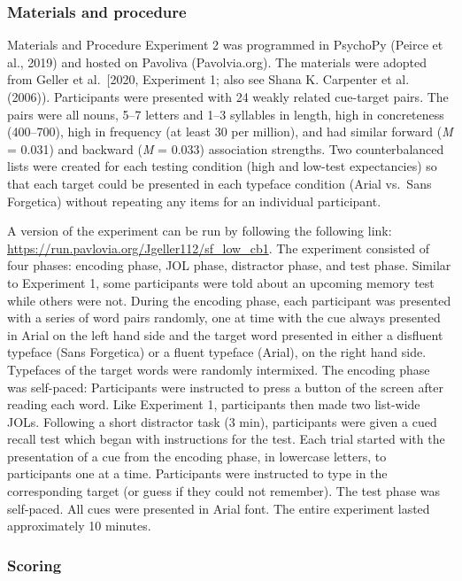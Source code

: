 \documentclass[
  english,
  jou]{apa7}
\begin{document}
\hypertarget{materials-and-procedure}{%
\subsubsection{Materials and procedure}\label{materials-and-procedure}}

Materials and Procedure
Experiment 2 was programmed in PsychoPy (Peirce et al., 2019) and hosted on Pavoliva (Pavolvia.org). The materials were adopted from Geller et al.~{[}2020, Experiment 1; also see Shana K. Carpenter et al. (2006)). Participants were presented with 24 weakly related cue-target pairs. The pairs were all nouns, 5--7 letters and 1--3 syllables in length, high in concreteness (400--700), high in frequency (at least 30 per million), and had similar forward (\emph{M} = 0.031) and backward (\emph{M} = 0.033) association strengths. Two counterbalanced lists were created for each testing condition (high and low-test expectancies) so that each target could be presented in each typeface condition (Arial vs.~Sans Forgetica) without repeating any items for an individual participant.

A version of the experiment can be run by following the following link: \url{https://run.pavlovia.org/Jgeller112/sf_low_cb1}. The experiment consisted of four phases: encoding phase, JOL phase, distractor phase, and test phase. Similar to Experiment 1, some participants were told about an upcoming memory test while others were not. During the encoding phase, each participant was presented with a series of word pairs randomly, one at time with the cue always presented in Arial on the left hand side and the target word presented in either a disfluent typeface (Sans Forgetica) or a fluent typeface (Arial), on the right hand side. Typefaces of the target words were randomly intermixed. The encoding phase was self-paced: Participants were instructed to press a button of the screen after reading each word. Like Experiment 1, participants then made two list-wide JOLs. Following a short distractor task (3 min), participants were given a cued recall test which began with instructions for the test. Each trial started with the presentation of a cue from the encoding phase, in lowercase letters, to participants one at a time. Participants were instructed to type in the corresponding target (or guess if they could not remember). The test phase was self-paced. All cues were presented in Arial font. The entire experiment lasted approximately 10 minutes.

\hypertarget{scoring}{%
\subsubsection{Scoring}\label{scoring}}
\end{document}
